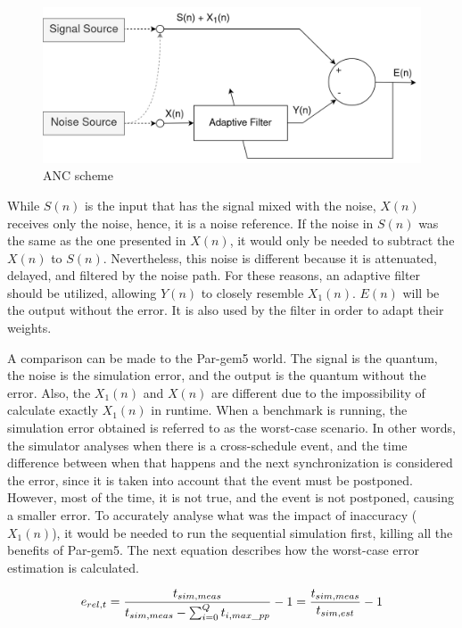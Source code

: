 \begin{figure}[H]
	\centering
 	\includegraphics[width=0.7\linewidth]{Images/AdaptiveNoiseCancellationScheme.png}
 	\caption{ANC scheme}
	 \label{fig_AdaptiveNoiseCancellationScheme}
\end{figure}

While $S(n)$ is the input that has the signal mixed with the noise, $X(n)$ receives only the noise, hence, it is a noise reference. If the noise 
in $S(n)$ was the same as the one presented in $X(n)$, it would only be needed to subtract the $X(n)$ to $S(n)$. Nevertheless, this noise is 
different because it is attenuated, delayed, and filtered by the noise path. For these reasons, an adaptive filter should be utilized, allowing 
$Y(n)$ to closely resemble $X_{1}(n)$. $E(n)$ will be the output without the error. It is also used by the filter in order to adapt their weights.

A comparison can be made to the Par-gem5 world. The signal is the quantum, the noise is the simulation error, and the output is the quantum 
without the error. Also, the $X_{1}(n)$ and $X(n)$ are different due to the impossibility of calculate exactly $X_{1}(n)$ in runtime. When a 
benchmark is running, the simulation error obtained is referred to as the worst-case scenario. In other words, the simulator analyses when there 
is a cross-schedule event, and the time difference between when that happens and the next synchronization is considered the error, since it 
is taken into account that the event must be postponed. However, most of the time, it is not true, and the event is not postponed, causing a smaller error. To 
accurately analyse what was the impact of inaccuracy ($X_{1}(n)$), it would be needed to run the sequential simulation first, killing 
all the benefits of Par-gem5. The next equation describes how the worst-case error estimation is calculated. 

\begin{equation}
    \label{eq_errSim}
    \centering
        \Large
        e_{rel,t} = \frac{t_{sim,meas}}{t_{sim,meas}-\sum_{i=0}^{Q}t_{i,max\_pp}} -1  = \frac{t_{sim,meas}}{t_{sim,est}}-1
        \normalsize
\end{equation}
\vspace{0.3cm}

